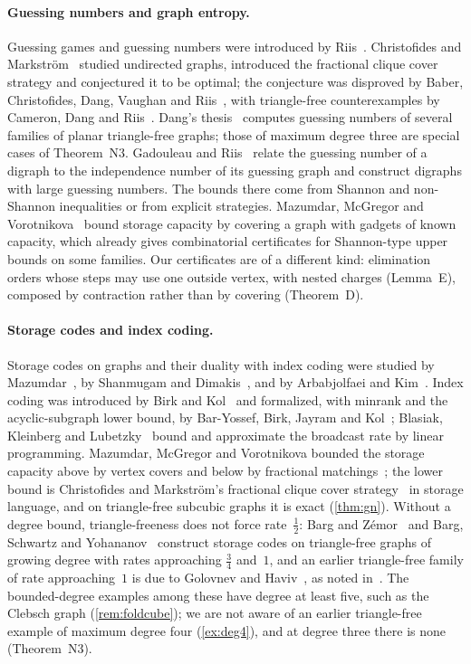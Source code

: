 \paragraph{Guessing numbers and graph entropy.} Guessing games and guessing numbers were introduced by
Riis~\cite{Riis2007}. Christofides and Markström~\cite{ChristofidesMarkstrom2011} studied undirected graphs, introduced
the fractional clique cover strategy and conjectured it to be optimal; the conjecture was disproved by Baber,
Christofides, Dang, Vaughan and Riis~\cite{Baber2017}, with triangle-free counterexamples by Cameron, Dang and
Riis~\cite{CameronDangRiis2016}. Dang's thesis~\cite{Dang2015} computes guessing numbers of several families of planar
triangle-free graphs; those of maximum degree three are special cases of Theorem~N3. Gadouleau and
Riis~\cite{GadouleauRiis2011} relate the guessing number of a digraph to the independence number of its guessing graph and
construct digraphs with large guessing numbers. The bounds there come from Shannon and non-Shannon inequalities or from
explicit strategies. Mazumdar, McGregor and Vorotnikova~\cite{MMV2019} bound storage capacity by covering a graph with
gadgets of known capacity, which already gives combinatorial certificates for Shannon-type upper bounds on some families.
Our certificates are of a different kind: elimination orders whose steps may use one outside vertex, with nested charges
(Lemma~E), composed by contraction rather than by covering (Theorem~D).

\paragraph{Storage codes and index coding.} Storage codes on graphs and their duality with index coding were studied by
Mazumdar~\cite{Mazumdar2014}, by Shanmugam and Dimakis~\cite{ShanmugamDimakis2014}, and by Arbabjolfaei and
Kim~\cite{ArbabjolfaeiKim2015}. Index coding was introduced by Birk and Kol~\cite{BirkKol2006} and formalized, with minrank
and the acyclic-subgraph lower bound, by Bar-Yossef, Birk, Jayram and Kol~\cite{BBJK2011}; Blasiak, Kleinberg and
Lubetzky~\cite{BKL2013} bound and approximate the broadcast rate by linear programming. Mazumdar, McGregor and Vorotnikova
bounded the storage capacity above by vertex covers and below by fractional matchings~\cite{MMV2019}; the lower bound is
Christofides and Markström's fractional clique cover strategy~\cite{ChristofidesMarkstrom2011} in storage language, and on
triangle-free subcubic graphs it is exact (\cref{thm:gn}). Without a degree bound, triangle-freeness does not force
rate~$\frac12$: Barg and Zémor~\cite{BargZemor2022} and Barg, Schwartz and Yohananov~\cite{BSY2024} construct storage codes
on triangle-free graphs of growing degree with rates approaching $\frac34$ and~$1$, and an earlier triangle-free family of
rate approaching~$1$ is due to Golovnev and Haviv~\cite{GolovnevHaviv2022}, as noted in~\cite{BSY2024}. The
bounded-degree examples among these have degree at least five, such as the Clebsch graph (\cref{rem:foldcube}); we are
not aware of an earlier triangle-free example of maximum degree four (\cref{ex:deg4}), and at degree three there is
none (Theorem~N3).

